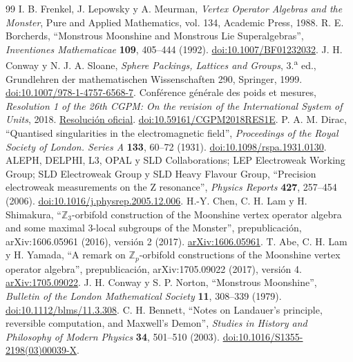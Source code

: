 \begin{thebibliography}{99}
 I. B. Frenkel, J. Lepowsky y A. Meurman, \emph{Vertex Operator Algebras and the Monster}, Pure and Applied Mathematics, vol. 134, Academic Press, 1988.
 R. E. Borcherds, ``Monstrous Moonshine and Monstrous Lie Superalgebras'', \emph{Inventiones Mathematicae} \textbf{109}, 405--444 (1992). \href{https://doi.org/10.1007/BF01232032}{doi:10.1007/BF01232032}.
 J. H. Conway y N. J. A. Sloane, \emph{Sphere Packings, Lattices and Groups}, 3.\textsuperscript{a} ed., Grundlehren der mathematischen Wissenschaften 290, Springer, 1999. \href{https://doi.org/10.1007/978-1-4757-6568-7}{doi:10.1007/978-1-4757-6568-7}.
 Conférence générale des poids et mesures, \emph{Resolution 1 of the 26th CGPM: On the revision of the International System of Units}, 2018. \href{https://www.bipm.org/en/committees/cg/cgpm/26-2018/resolution-1}{Resolución oficial}. \href{https://doi.org/10.59161/CGPM2018RES1E}{doi:10.59161/CGPM2018RES1E}.
 P. A. M. Dirac, ``Quantised singularities in the electromagnetic field'', \emph{Proceedings of the Royal Society of London. Series A} \textbf{133}, 60--72 (1931). \href{https://doi.org/10.1098/rspa.1931.0130}{doi:10.1098/rspa.1931.0130}.
 ALEPH, DELPHI, L3, OPAL y SLD Collaborations; LEP Electroweak Working Group; SLD Electroweak Group y SLD Heavy Flavour Group, ``Precision electroweak measurements on the Z resonance'', \emph{Physics Reports} \textbf{427}, 257--454 (2006). \href{https://doi.org/10.1016/j.physrep.2005.12.006}{doi:10.1016/j.physrep.2005.12.006}.
 H.-Y. Chen, C. H. Lam y H. Shimakura, ``\(\mathbb Z_3\)-orbifold construction of the Moonshine vertex operator algebra and some maximal \(3\)-local subgroups of the Monster'', prepublicación, arXiv:1606.05961 (2016), versión 2 (2017). \href{https://arxiv.org/abs/1606.05961}{arXiv:1606.05961}.
 T. Abe, C. H. Lam y H. Yamada, ``A remark on \(\mathbb Z_p\)-orbifold constructions of the Moonshine vertex operator algebra'', prepublicación, arXiv:1705.09022 (2017), versión 4. \href{https://arxiv.org/abs/1705.09022v4}{arXiv:1705.09022}.
 J. H. Conway y S. P. Norton, ``Monstrous Moonshine'', \emph{Bulletin of the London Mathematical Society} \textbf{11}, 308--339 (1979). \href{https://doi.org/10.1112/blms/11.3.308}{doi:10.1112/blms/11.3.308}.
 C. H. Bennett, ``Notes on Landauer's principle, reversible computation, and Maxwell's Demon'', \emph{Studies in History and Philosophy of Modern Physics} \textbf{34}, 501--510 (2003). \href{https://doi.org/10.1016/S1355-2198(03)00039-X}{doi:10.1016/S1355-2198(03)00039-X}.
\end{thebibliography}
